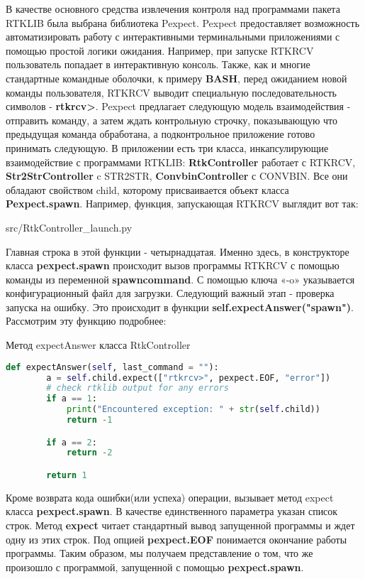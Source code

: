 В качестве основного средства извлечения контроля над программами пакета RTKLIB была выбрана библиотека Pexpect. Pexpect предоставляет возможность автоматизировать работу с интерактивными терминальными приложениями с помощью простой логики ожидания. Например, при запуске RTKRCV пользователь попадает в интерактивную консоль. Также, как и многие стандартные командные оболочки, к примеру \textbf{BASH}, перед ожиданием новой команды пользователя, RTKRCV выводит специальную последовательность символов - \textbf{rtkrcv>}. Pexpect предлагает следующую модель взаимодействия - отправить команду, а затем ждать контрольную строчку, показывающую что предыдущая команда обработана, а подконтрольное приложение готово принимать следующую. В приложении есть три класса, инкапсулирующие взаимодействие с программами RTKLIB: \textbf{RtkController} работает с RTKRCV, \textbf{Str2StrController} c STR2STR, \textbf{ConvbinController} с CONVBIN. Все они обладают свойством child, которому присваивается объект класса \textbf{Pexpect.spawn}. Например, функция, запускающая RTKRCV выглядит вот так:


{src/RtkController_launch.py}

Главная строка в этой функции - четырнадцатая. Именно здесь, в конструкторе класса \textbf{pexpect.spawn} происходит вызов программы RTKRCV с помощью команды из переменной \textbf{spawn\textunderscore command}. С помощью ключа «-o» указывается конфигурационный файл для загрузки. Следующий важный этап - проверка запуска на ошибку. Это происходит в функции \textbf{self.expectAnswer("spawn")}. Рассмотрим эту функцию подробнее:

\begin{ListingEnv}[H]
  \caption{Метод expectAnswer класса RtkController}
  \label{list:hwbeauty}
  \begin{lstlisting}[language=Python]
    def expectAnswer(self, last_command = ""):
        a = self.child.expect(["rtkrcv>", pexpect.EOF, "error"])
        # check rtklib output for any errors
        if a == 1:
            print("Encountered exception: " + str(self.child))
            return -1

        if a == 2:
            return -2

        return 1
  \end{lstlisting}
\end{ListingEnv}

Кроме возврата кода ошибки(или успеха) операции, вызывает метод expect класса \textbf{pexpect.spawn}. В качестве единственного параметра указан список строк. Метод \textbf{expect} читает стандартный вывод запущенной программы и ждет одну из этих строк. Под опцией \textbf{pexpect.EOF} понимается окончание работы программы. Таким образом, мы получаем представление о том, что же произошло с программой, запущенной с помощью \textbf{pexpect.spawn}.

